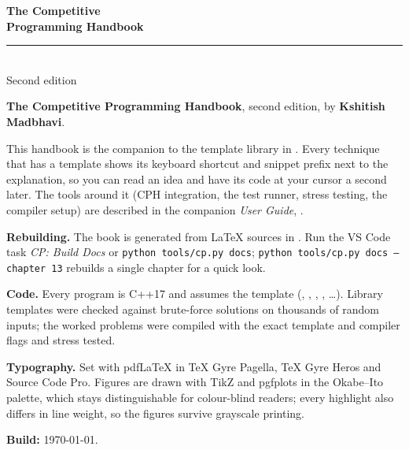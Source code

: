 \thispagestyle{empty}
\vspace*{7cm}
\begin{center}
  {\sffamily\bfseries\Huge\color{cpblue} The Competitive\\[4pt] Programming Handbook}\\[1.2cm]
  {\color{cpteal}\rule{4cm}{1.2pt}}\\[1.2cm]
  {\sffamily\large\color{fggray} Second edition}
\end{center}
\clearpage

\thispagestyle{empty}
\vspace*{\fill}
{\small
{}\par\medskip

\noindent\textbf{The Competitive Programming Handbook}, second edition, by \textbf{Kshitish Madbhavi}.\par\medskip

\noindent This handbook is the companion to the template library in . Every technique that has a
template shows its keyboard shortcut and snippet prefix next to the explanation, so you can read an idea and have its code at
your cursor a second later. The tools around it (CPH integration, the test runner, stress testing, the compiler setup) are
described in the companion \emph{User Guide}, .\par\medskip

\noindent\textbf{Rebuilding.} The book is generated from LaTeX sources in . Run the VS Code task
\emph{CP: Build Docs} or \texttt{python tools/cp.py docs}; \texttt{python tools/cp.py docs --chapter 13} rebuilds a single
chapter for a quick look.\par\medskip

\noindent\textbf{Code.} Every program is C++17 and assumes the template (, , ,
, \ldots). Library templates were checked against brute-force solutions on thousands of random inputs; the worked
problems were compiled with the exact template and compiler flags and stress tested.\par\medskip

\noindent\textbf{Typography.} Set with pdf\LaTeX{} in TeX Gyre Pagella, TeX Gyre Heros and Source Code Pro. Figures are drawn
with TikZ and pgfplots in the Okabe--Ito palette, which stays distinguishable for colour-blind readers; every highlight also
differs in line weight, so the figures survive grayscale printing.\par\medskip

\noindent\textbf{Build:} \today.\par}
\clearpage
